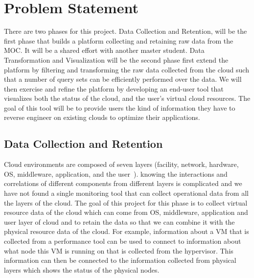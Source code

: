 \section{Problem Statement}
\label{sec:ProblemStatement}

%

There are two phases for this project. Data Collection and Retention, will be the first phase that builds a platform collecting and retaining raw data from the MOC. It will be a shared effort with another master student.  
Data Transformation and Visualization will be the second phase first extend the platform by filtering and transforming the raw data collected from the cloud such that a number of query sets can be efficiently performed over the data. We will then exercise and refine the platform by developing an end-user tool that visualizes both the status of the cloud, and the user’s virtual cloud resources. The goal of this tool will be to provide users the kind of information they have to reverse engineer on existing clouds to optimize their applications.

\subsection{Data Collection and Retention}

Cloud environments are composed of seven layers  (facility, network, hardware, OS, middleware, application, and the user~\cite{spring2011monitoring}). knowing the interactions and correlations of different components from different layers is complicated and we have not found a single monitoring tool that can collect operational data from all the layers of the cloud. The goal of this project for this phase is to collect virtual resource data of the cloud which can come from OS, middleware, application and user layer of cloud and to retain the data so that we can combine it with the physical resource data of the cloud. For example, information about a VM that is collected from a performance tool can be used to connect to information about what node this VM is running on that is collected from the hypervisor. This information can then be connected to the information collected from physical layers which shows the status of the physical nodes. 

